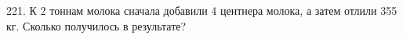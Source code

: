 221. К 2 тоннам молока сначала добавили 4 центнера молока, а затем отлили 355 кг. Сколько получилось в результате?\\

